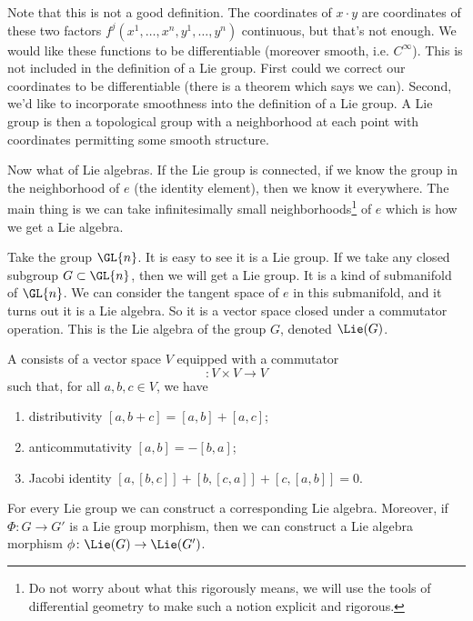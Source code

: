 Note that this is not a good definition. The coordinates of
$x\cdot y$ are coordinates of these two factors
$f^{j}(x^1,\ldots,x^n,y^1,\ldots,y^n)$ continuous, but that's not
enough. We would like these functions to be differentiable
(moreover smooth, i.e. $C^{\infty}$). This is not included in the
definition of a Lie group. First could we correct our coordinates
to be differentiable (there is a theorem which says we
can). Second, we'd like to incorporate smoothness into the
definition of a Lie group. A Lie group is then a topological
group with a neighborhood at each point with coordinates
permitting some smooth structure.

Now what of Lie algebras. If the Lie group is connected, if we
know the group in the neighborhood of $e$ (the identity element),
then we know it everywhere. The main thing is we can take
infinitesimally small neighborhoods\footnote{Do not worry about
  what this rigorously means, we will use the tools of
  differential geometry to make such a notion explicit and
  rigorous.} of $e$ which is how we get a Lie algebra.

Take the group $\GL{n}$. It is easy to see it is a Lie group. If
we take any closed subgroup $G\subset\GL{n}$, then we will get a
Lie group. It is a kind of submanifold of $\GL{n}$. We can
consider the tangent space of $e$ in this submanifold, and it
turns out it is a Lie algebra. So it is a vector space closed
under a commutator operation. This is the Lie algebra of the
group $G$, denoted $\Lie(G)$.

\begin{defn}
A  consists of a vector space $V$
equipped with a commutator
\begin{equation}
[\cdot,\cdot]\colon V\times V\to V
\end{equation}
such that, for all $a,b,c\in V$, we have
\begin{enumerate}
\item distributivity $[a,b+c]=[a,b]+[a,c]$;
\item anticommutativity $[a,b]=-[b,a]$;
\item Jacobi identity $[a,[b,c]]+[b,[c,a]]+[c,[a,b]]=0$.
\end{enumerate}
\end{defn}
\begin{prop}\label{prop:lieAlgebraMorphism}
For every Lie group we can construct a corresponding Lie
algebra. Moreover, if $\Phi\colon G\to G'$ is a Lie group
morphism, then we can construct a Lie algebra morphism $\phi\colon\Lie(G)\to\Lie(G')$.
\end{prop}

